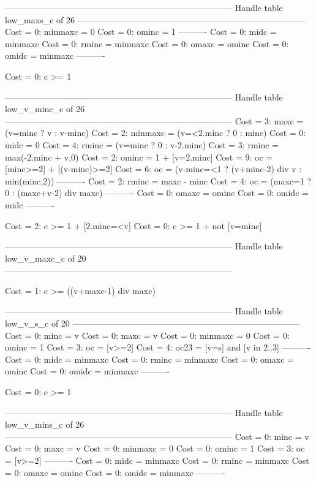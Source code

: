 --------------------------------------------------------------------------------
Handle table low_maxs_c of 26
--------------------------------------------------------------------------------
Cost =  0:  minmaxc = 0
Cost =  0:  ominc   = 1
----------
Cost =  0:  midc    = minmaxc
Cost =  0:  rminc   = minmaxc
Cost =  0:  omaxc   = ominc
Cost =  0:  omidc   = minmaxc
----------

Cost =  0:  c >= 1

--------------------------------------------------------------------------------
Handle table low_v_minc_c of 26
--------------------------------------------------------------------------------
Cost =  3:  maxc    = (v=minc ? v : v-minc)
Cost =  2:  minmaxc = (v=<2.minc ? 0 : minc)
Cost =  0:  midc    = 0
Cost =  4:  rminc   = (v=minc ? 0 : v-2.minc)
Cost =  3:  rminc   = max(-2.minc + v,0)
Cost =  2:  ominc   = 1 + [v=2.minc]
Cost =  9:  oc      = [minc>=2] + [(v-minc)>=2]
Cost =  6:  oc      = (v-minc=<1 ? (v+minc-2) div v : min(minc,2))
----------
Cost =  2:  rminc   = maxc - minc
Cost =  4:  oc      = (maxc=1 ? 0 : (maxc+v-2) div maxc)
----------
Cost =  0:  omaxc   = ominc
Cost =  0:  omidc   = midc
----------

Cost =  2:  c >= 1 + [2.minc=<v]
Cost =  0:  c >= 1 + not [v=minc]

--------------------------------------------------------------------------------
Handle table low_v_maxc_c of 20
--------------------------------------------------------------------------------

Cost =  1:  c >= ((v+maxc-1) div maxc)

--------------------------------------------------------------------------------
Handle table low_v_s_c of 20
--------------------------------------------------------------------------------
Cost =  0:  minc    = v
Cost =  0:  maxc    = v
Cost =  0:  minmaxc = 0
Cost =  0:  ominc   = 1
Cost =  3:  oc      = [v>=2]
Cost =  4:  oc23    = [v=s] and [v in 2..3]
----------
Cost =  0:  midc    = minmaxc
Cost =  0:  rminc   = minmaxc
Cost =  0:  omaxc   = ominc
Cost =  0:  omidc   = minmaxc
----------

Cost =  0:  c >= 1

--------------------------------------------------------------------------------
Handle table low_v_mins_c of 26
--------------------------------------------------------------------------------
Cost =  0:  minc    = v
Cost =  0:  maxc    = v
Cost =  0:  minmaxc = 0
Cost =  0:  ominc   = 1
Cost =  3:  oc      = [v>=2]
----------
Cost =  0:  midc    = minmaxc
Cost =  0:  rminc   = minmaxc
Cost =  0:  omaxc   = ominc
Cost =  0:  omidc   = minmaxc
----------

